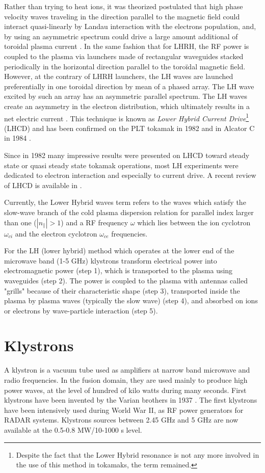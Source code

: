Rather than trying to heat ions, it was theorized postulated that high phase velocity waves traveling in the direction parallel to the magnetic field could interact quasi-linearly by Landau interaction with the electrons population, and, by using an asymmetric spectrum could drive a large amount additional of toroidal plasma current \parencite{Fisch1978}. In the same fashion that for LHRH, the RF power is coupled to the plasma via launchers made of rectangular waveguides stacked periodically in the horizontal direction parallel to the toroïdal magnetic field. However, at the contrary of LHRH launchers, the LH waves are launched preferentially in one toroidal direction by mean of a phased array. The LH wave excited by such an array has an asymmetric parallel spectrum. The LH waves create an asymmetry in the electron distribution, which ultimately results in a net electric current \parencite{Fisch1987}. This technique is known as \emph{Lower Hybrid Current Drive}\footnote{Despite the fact that the Lower Hybrid resonance is not any more involved in the use of this method in tokamaks, the term remained.} (LHCD) and has been confirmed on the PLT tokamak in 1982 \parencite{Bernabei1982, Motley1985, Jobes1985} and in Alcator C in 1984 \parencite{Porkolab1984}. 

Since in 1982 many impressive results were presented on LHCD\parencite{Hooke1982, Porkolab1984, Tonon1982} toward steady state or quasi steady state tokamak operations, most LH experiments were dedicated to electron interaction and especially to current drive. A recent review of LHCD is available in \parencite{Bonoli2014}.

Currently, the Lower Hybrid waves term refers to the waves which satisfy the slow-wave branch of the cold plasma dispersion relation for parallel index larger than one ($|n_{\parallel}|>1$) and a RF frequency $\omega$ which lies between the ion cyclotron $\omega_{ci}$ and the electron cyclotron $\omega_{ce}$ frequencies. 

For the LH (lower hybrid) method which operates at the lower end of the microwave band (1-5 GHz) klystrons transform electrical power into electromagnetic power (step 1), which is transported to the plasma using waveguides (step 2). The power is coupled to the plasma with antennas called "grills" because of their characteristic shape (step 3), transported inside the plasma by plasma waves (typically the slow wave) (step 4), and absorbed on ions or electrons by wave-particle interaction (step 5).

\section{Klystrons}
A klystron is a vacuum tube used as amplifiers at narrow band microwave and radio frequencies. In the fusion domain, they are used mainly to produce high power waves, at the level of hundred of kilo watts during many seconds. First klystrons have been invented by the Varian brothers in 1937 \parencite{Pond2008}. The first klystrons have been intensively used during World War II, as RF power generators for RADAR systems. Klystrons sources between 2.45 GHz and 5 GHz are now available at the 0.5-0.8 MW/10-1000 s level\parencite{Pond2008}. 

